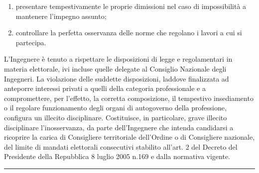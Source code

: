 \documentclass[letterpaper,10pt,italian]{sphinxmanual}
\begin{document}
\begin{description}
\begin{enumerate}
\item {} 
\sphinxAtStartPar
presentare tempestivamente le proprie dimissioni nel caso di impossibilità a mantenere l’impegno assunto;

\item {} 
\sphinxAtStartPar
controllare la perfetta osservanza delle norme che regolano i lavori a cui si partecipa.

\end{enumerate}

\sphinxAtStartPar
L’Ingegnere è tenuto a rispettare le disposizioni di legge e regolamentari in materia elettorale, ivi incluse quelle delegate al Consiglio Nazionale degli Ingegneri. La violazione delle suddette disposizioni, laddove finalizzata ad anteporre interessi privati a quelli della categoria professionale e a compromettere, per l’effetto, la corretta composizione, il tempestivo insediamento o il regolare funzionamento degli organi di autogoverno della professione, configura un illecito disciplinare. Costituisce, in particolare, grave illecito disciplinare l’inosservanza, da parte dell’Ingegnere che intenda candidarsi a ricoprire la carica di Consigliere territoriale dell’Ordine o di Consigliere nazionale, del limite di mandati elettorali consecutivi stabilito all’art. 2 del Decreto del Presidente della Repubblica 8 luglio 2005 n.169 e dalla normativa vigente.

\end{description}


\bigskip\hrule\bigskip



\section{}
\label{\detokenize{capitoli/codice/codice_deontologico:capo-vi-incompatibilita}}
\end{document}
